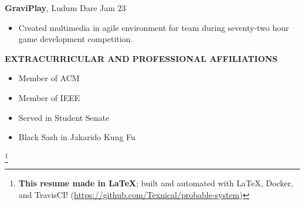 \documentclass[letterpaper]{article}
\newcommand{\altsection}[1]{\noindent\textbf{#1}\smallskip}
\newcommand{\entry}[3]{\textbf{#1}, #2\begin{itemize}[leftmargin=3.5em]#3\end{itemize}\bigskip}
\newcommand\eol[1]{%
    \begingroup
    \renewcommand\thefootnote{}\footnote{#1}%
    \addtocounter{footnote}{-1}%
    \endgroup
}
\begin{document}
\entry{GraviPlay}{Ludum Dare Jam 23} {
    \item Created multimedia in agile environment for team during seventy-two hour game development competition.
}

\altsection{EXTRACURRICULAR AND PROFESSIONAL AFFILIATIONS}

\begin{multicols}{2}
\begin{itemize}[leftmargin=3.5em]
\item Member of ACM
\item Member of IEEE
\item Served in Student Senate
\item Black Sash in Jakarido Kung Fu
\end{itemize}
\end{multicols}

\eol{\noindent\textbf{This resume made in \LaTeX{}}; built and automated with \LaTeX{}, Docker, and TravisCI! (\url{https://github.com/Texnical/probable-system})}
\end{document}
